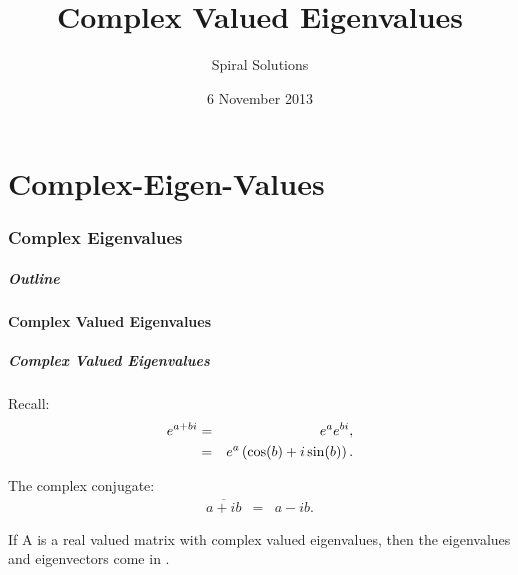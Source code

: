 \part{Complex-Eigen-Values}
\section{Complex Eigenvalues}


\title{Complex Valued Eigenvalues}
\subtitle{Spiral Solutions}
\date{6 November 2013}

\begin{frame}
  \titlepage
\end{frame}

\begin{frame}
  \frametitle{Outline}
  \tableofcontents[currentsection]
\end{frame}


\subsection{Complex Valued Eigenvalues}


\begin{frame}
  \frametitle{Complex Valued Eigenvalues}

  Recall:
  \begin{eqnarray*}
    e^{a+bi} & = & e^a e^{bi}, \\
    & = & e^a \left( \cos(b) + i \sin(b) \right).
  \end{eqnarray*}

  \vfill

  The complex conjugate:
  \begin{eqnarray*}
    \overline{a+ib} & = & a-i b.
  \end{eqnarray*}

  \vfill

  If A is a real valued matrix with complex valued eigenvalues, then
  the eigenvalues and eigenvectors come in .

\end{frame}


